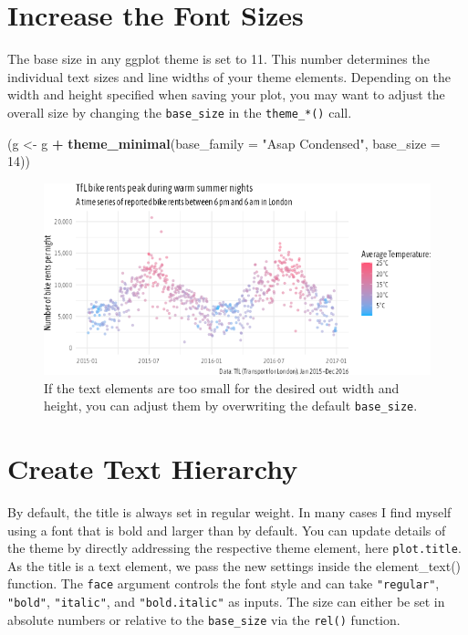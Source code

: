 \documentclass[
]{krantz}
\makeatletter
\newenvironment{Shaded}{\begin{snugshade}}{\end{snugshade}}
\newcommand{\AttributeTok}[1]{\textcolor[rgb]{0.27,0.27,0.27}{#1}}
\newcommand{\DecValTok}[1]{\textcolor[rgb]{0.06,0.06,0.06}{#1}}
\newcommand{\FunctionTok}[1]{\textcolor[rgb]{0.27,0.27,0.27}{\textbf{#1}}}
\newcommand{\NormalTok}[1]{#1}
\newcommand{\OtherTok}[1]{\textcolor[rgb]{0.37,0.37,0.37}{#1}}
\newcommand{\SpecialCharTok}[1]{\textcolor[rgb]{0.43,0.43,0.43}{\textbf{#1}}}
\newcommand{\StringTok}[1]{\textcolor[rgb]{0.5,0.5,0.5}{#1}}
\newenvironment{kframe}{%
\medskip{}
\setlength{\fboxsep}{.8em}
 \def\at@end@of@kframe{}%
 \ifinner\ifhmode%
  \def\at@end@of@kframe{\end{minipage}}%
  \begin{minipage}{\columnwidth}%
 \fi\fi%
 \def\FrameCommand##1{\hskip\@totalleftmargin \hskip-\fboxsep
 \colorbox{shadecolor}{##1}\hskip-\fboxsep
     \hskip-\linewidth \hskip-\@totalleftmargin \hskip\columnwidth}%
 \MakeFramed {\advance\hsize-\width
   \@totalleftmargin\z@ \linewidth\hsize
   \@setminipage}}%
 {\par\unskip\endMakeFramed%
 \at@end@of@kframe}
\renewenvironment{Shaded}{\begin{kframe}}{\end{kframe}}
\makeatother
\begin{document}
\hypertarget{increase-the-font-sizes}{%
\section{Increase the Font Sizes}\label{increase-the-font-sizes}}

The base size in any ggplot theme is set to 11. This number determines the individual text sizes and line widths of your theme elements. Depending on the width and height specified when saving your plot, you may want to adjust the overall size by changing the \texttt{base\_size} in the \texttt{theme\_*()} call.

\begin{Shaded}
\begin{Highlighting}[]
\NormalTok{(g }\OtherTok{\textless{}{-}}\NormalTok{ g }\SpecialCharTok{+} \FunctionTok{theme\_minimal}\NormalTok{(}\AttributeTok{base\_family =} \StringTok{"Asap Condensed"}\NormalTok{, }\AttributeTok{base\_size =} \DecValTok{14}\NormalTok{))}
\end{Highlighting}
\end{Shaded}

\begin{figure}
\centering
\includegraphics{bookdown_files/figure-latex/05themeBaseSize-1.png}
\caption{\label{fig:05themeBaseSize}If the text elements are too small for the desired out width and height, you can adjust them by overwriting the default \texttt{base\_size}.}
\end{figure}

\hypertarget{create-text-hierarchy}{%
\section{Create Text Hierarchy}\label{create-text-hierarchy}}

By default, the title is always set in regular weight. In many cases I find myself using a font that is bold and larger than by default. You can update details of the theme by directly addressing the respective theme element, here \texttt{plot.title}. As the title is a text element, we pass the new settings inside the element\_text() function. The \texttt{face} argument controls the font style and can take \texttt{"regular"}, \texttt{"bold"}, \texttt{"italic"}, and \texttt{"bold.italic"} as inputs. The size can either be set in absolute numbers or relative to the \texttt{base\_size} via the \texttt{rel()} function.
\end{document}
